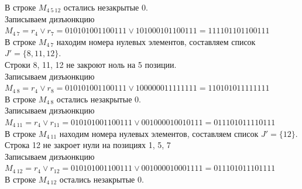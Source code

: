 \documentclass[a4paper,12pt]{article}
\begin{document}
В строке $M_{4\ 5\ 12}$ остались незакрытые 0.\\
Записываем дизъюнкцию $M_{4\ 7} = r_{4}\lor r_{7} = 010101001100111 \lor 101000101100111 = 111101101100111$\\
В строке $M_{4\ 7}$ находим номера нулевых элементов, составляем список $J' = \{8, 11, 12\}$.\\
Строки 8, 11, 12 не закроют ноль на 5 позиции.\\
Записываем дизъюнкцию $M_{4\ 8} = r_{4}\lor r_{8} = 010101001100111 \lor 100000011111111 = 110101011111111$\\
В строке $M_{4\ 8}$ остались незакрытые 0.\\
Записываем дизъюнкцию $M_{4\ 11} = r_{4}\lor r_{11} = 010101001100111 \lor 001000010010111 = 011101011110111$\\
В строке $M_{4\ 11}$ находим номера нулевых элементов, составляем список $J' = \{12\}$.\\
Строка 12 не закроет нули на позициях 1, 5, 7\\
Записываем дизъюнкцию $M_{4\ 12} = r_{4}\lor r_{12} = 010101001100111 \lor 001000010001111 = 011101011101111$\\
В строке $M_{4\ 12}$ остались незакрытые 0.\\
\end{document}
